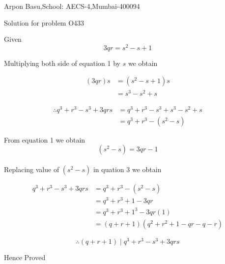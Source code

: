 \documentclass[a4paper,10pt]{article}
\title{}
\author{}
\begin{document}
\begin{center}


Arpon Basu,School: AECS-4,Mumbai-400094

Solution for problem O433
\end{center}


Given 
\begin{equation} \label{eq1}
 3qr=s^2 -s+1
\end{equation}




Multiplying both side of equation 1 by $s$ we obtain

\begin{equation} 
\begin{split}
(3qr)s & = (s^2 -s+1)s \\
 & = s^3-s^2+s
\end{split}
\end{equation}


\begin{equation} 
\begin{split}
\therefore q^3+r^3-s^3+3qrs & = q^3+r^3-s^3+s^3-s^2+s  \\
 & = q^3+r^3-(s^2-s)
\end{split}
\end{equation}


From equation 1 we obtain $$(s^2 -s)=3qr-1 $$ \\
Replacing value of $(s^2 -s)$ in quation 3 we obtain


\begin{equation} \label{}
\begin{split}
 q^3+r^3-s^3+3qrs &= q^3+r^3-(s^2-s) \\
 & = q^3+r^3+1 - 3qr \\
 & =q^3+r^3+1^3 - 3qr(1)\\
 & =(q+r+1)(q^2+r^2+1-qr-q-r)
\end{split}
\end{equation}
 
 
$$\therefore (q+r+1) \mid q^3+r^3-s^3+3qrs $$

Hence Proved     
\end{document}

